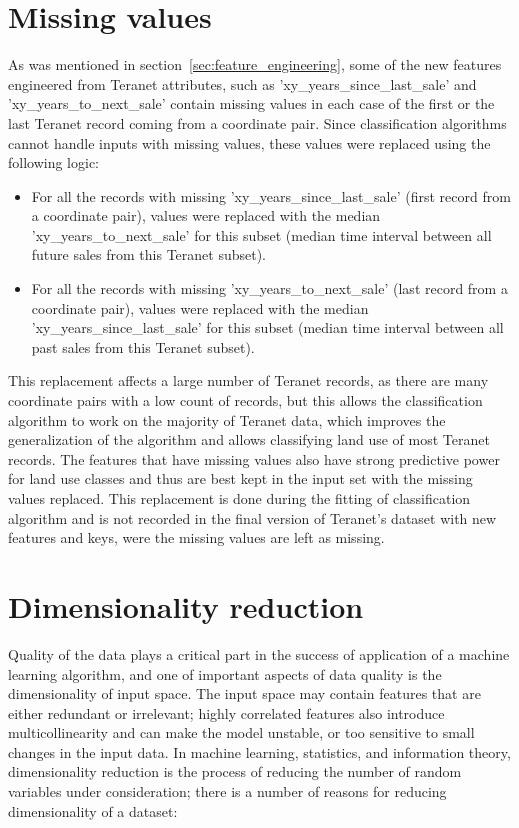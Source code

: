 \section{Missing values} \label{sec:missing_values}

As was mentioned in section~\ref{sec:feature_engineering}, some of the new features engineered from Teranet attributes, such as 'xy\_years\_since\_last\_sale' and 'xy\_years\_to\_next\_sale' contain missing values in each case of the first or the last Teranet record coming from a coordinate pair.
Since classification algorithms cannot handle inputs with missing values, these values were replaced using the following logic:

\begin{itemize}
    \item For all the records with missing 'xy\_years\_since\_last\_sale' (first record from a coordinate pair), values were replaced with the median 'xy\_years\_to\_next\_sale' for this subset (median time interval between all future sales from this Teranet subset).
    \item For all the records with missing 'xy\_years\_to\_next\_sale' (last record from a coordinate pair), values were replaced with the median 'xy\_years\_since\_last\_sale' for this subset (median time interval between all past sales from this Teranet subset).
\end{itemize}

This replacement affects a large number of Teranet records, as there are many coordinate pairs with a low count of records, but this allows the classification algorithm to work on the majority of Teranet data, which improves the generalization of the algorithm and allows classifying land use of most Teranet records.
The features that have missing values also have strong predictive power for land use classes and thus are best kept in the input set with the missing values replaced.
This replacement is done during the fitting of classification algorithm and is not recorded in the final version of Teranet's dataset with new features and keys, were the missing values are left as missing.

\section{Dimensionality reduction} \label{sec:dimensionality_reduction}

Quality of the data plays a critical part in the success of application of a machine learning algorithm, and one of important aspects of data quality is the dimensionality of input space.
The input space may contain features that are either redundant or irrelevant;
highly correlated features also introduce multicollinearity and can make the model unstable, or too sensitive to small changes in the input data.
In machine learning, statistics, and information theory, dimensionality reduction is the process of reducing the number of random variables under consideration;
there is a number of reasons for reducing dimensionality of a dataset:

